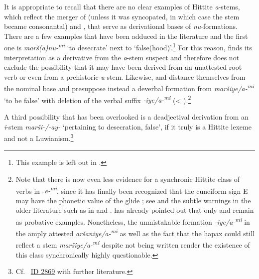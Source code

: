 \documentclass[output=paper,colorlinks,citecolor=brown]{langscibook}
\begin{document}
It is appropriate to recall that there are no clear examples of Hittite \textit{a}-stems, which reflect the merger of  (unless it was syncopated, in which case the stem became consonantal) and , that serve as derivational bases of \textit{nu}-formations. There are a few examples that have been adduced in the literature and the first one is \textit{marš(a)nu-\textsuperscript{mi}} ‘to desecrate’ next to  ‘false(hood)’.\footnote{This example is left out in \citealt[70--72]{Vanseveren2014}.} For this reason, \citet[29]{Koch1973} finds its interpretation as a derivative from the \textit{a}-stem  suspect and therefore does not exclude the possibility that it may have been derived from an unattested root verb or even from a prehistoric \textit{u}-stem. Likewise, \citet[239, fn.\ 1]{Oettinger1979} and \citet[157]{Luraghi1992} distance themselves from the nominal base  and presuppose instead a deverbal formation from \textit{maršiye/a-\textsuperscript{mi}} ‘to be false’ with deletion of the verbal suffix \textit{-iye/a-\textsuperscript{mi}} (< ).\footnote{Note that there is now even less evidence for a synchronic Hittite class of  verbs in -\textit{e-\textsuperscript{mi}}, since it has finally been recognized that the cuneiform sign E may have the phonetic value of the glide ; see \citealt[134--161]{Kloekhorst2014} and the subtle warnings in the older literature such as in \citealt[10]{Neu1983} and \citealt[35, 141--142]{Melchert1994}. \citet[225--226]{Oettinger1992} has already pointed out that only  and  remain as probative examples. Nonetheless, the unmistakable formation \textit{-iye/a-\textsuperscript{mi}} in the amply attested \textit{aršaniye/a-\textsuperscript{mi}} as well as the fact that the hapax  could still reflect a stem \textit{maršiye/a-\textsuperscript{mi}} despite not being written  render the existence of this class synchronically highly questionable.} 

\largerpage
A third possibility that has been overlooked is a deadjectival derivation  from an \textit{i}-stem \textit{marši-/-ay-} ‘pertaining to desecration, false’, if it truly is a Hittite lexeme and not a Luwianism.\footnote{Cf.\   \href{http://www.ediana.gwi.uni-muenchen.de/dictionary.php?lemma=2869}{ID 2869} with further literature.} 
\end{document}
